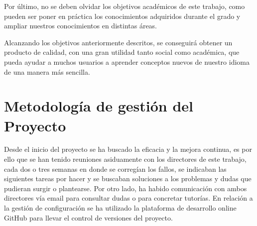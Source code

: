 Por último, no se deben olvidar los objetivos académicos de este trabajo, como pueden ser poner en práctica los conocimientos adquiridos durante el grado y ampliar nuestros conocimientos en distintas áreas. 

Alcanzando los objetivos anteriormente descritos, se conseguirá obtener un producto de calidad, con una gran utilidad tanto social como académica, que pueda ayudar a muchos usuarios a aprender conceptos nuevos de nuestro idioma de una manera más sencilla.
	
\section{Metodología de gestión del Proyecto}
\label{cap:sec:gestionProyecto}

Desde el inicio del proyecto se ha buscado la eficacia y la mejora continua, es por ello que se han tenido reuniones asiduamente con los directores de este trabajo, cada dos o tres semanas en donde se corregían los fallos, se indicaban las siguientes tareas por hacer y se buscaban soluciones a los problemas y dudas que pudieran surgir o plantearse.
Por otro lado, ha habido comunicación con ambos directores vía email para consultar dudas o para concretar tutorías. En relación a la gestión de configuración se ha utilizado la plataforma de desarrollo online GitHub para llevar el control de versiones del proyecto.

